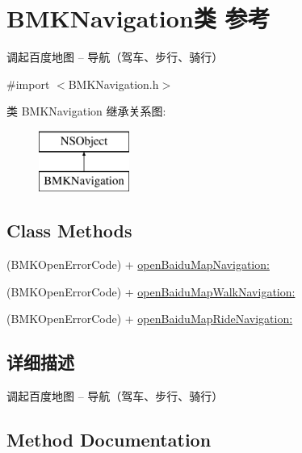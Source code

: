 \hypertarget{interface_b_m_k_navigation}{}\section{B\+M\+K\+Navigation类 参考}
\label{interface_b_m_k_navigation}


调起百度地图 -- 导航（驾车、步行、骑行）  




{\ttfamily \#import $<$B\+M\+K\+Navigation.\+h$>$}

类 B\+M\+K\+Navigation 继承关系图\+:\begin{figure}[H]
\begin{center}
\leavevmode
\includegraphics[height=2.000000cm]{interface_b_m_k_navigation}
\end{center}
\end{figure}
\subsection*{Class Methods}
\begin{DoxyCompactItemize}
\item 
(B\+M\+K\+Open\+Error\+Code) + \hyperlink{interface_b_m_k_navigation_a32f3aad5b3ac26b98bb794297c9aef3e}{open\+Baidu\+Map\+Navigation\+:}
\item 
(B\+M\+K\+Open\+Error\+Code) + \hyperlink{interface_b_m_k_navigation_aaf2588ccb6f630ed3e36b1eee2f5b767}{open\+Baidu\+Map\+Walk\+Navigation\+:}
\item 
(B\+M\+K\+Open\+Error\+Code) + \hyperlink{interface_b_m_k_navigation_acf2e5fac7c35c78f2ffd79b873cf4bb8}{open\+Baidu\+Map\+Ride\+Navigation\+:}
\end{DoxyCompactItemize}


\subsection{详细描述}
调起百度地图 -- 导航（驾车、步行、骑行） 

\subsection{Method Documentation}
\hypertarget{interface_b_m_k_navigation_a32f3aad5b3ac26b98bb794297c9aef3e}{}
